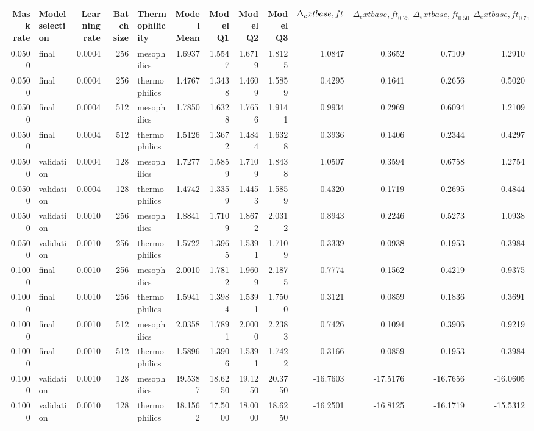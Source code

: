 \begin{tabular}{rlrrlrrrrrrrr}
\toprule
Mask rate & Model selection & Learning rate & Batch size & Thermophilicity & Model Mean & Model Q1 & Model Q2 & Model Q3 & $\Bar{\Delta_	ext{base,ft}}$ & $\Delta_	ext{base,ft}_0.25$ & $\Delta_	ext{base,ft}_0.50$ & $\Delta_	ext{base,ft}_0.75$ \\
\midrule
0.0500 & final & 0.0004 & 256 & mesophilics & 1.6937 & 1.5547 & 1.6719 & 1.8125 & 1.0847 & 0.3652 & 0.7109 & 1.2910 \\
0.0500 & final & 0.0004 & 256 & thermophilics & 1.4767 & 1.3438 & 1.4609 & 1.5859 & 0.4295 & 0.1641 & 0.2656 & 0.5020 \\
0.0500 & final & 0.0004 & 512 & mesophilics & 1.7850 & 1.6328 & 1.7656 & 1.9141 & 0.9934 & 0.2969 & 0.6094 & 1.2109 \\
0.0500 & final & 0.0004 & 512 & thermophilics & 1.5126 & 1.3672 & 1.4844 & 1.6328 & 0.3936 & 0.1406 & 0.2344 & 0.4297 \\
0.0500 & validation & 0.0004 & 128 & mesophilics & 1.7277 & 1.5859 & 1.7109 & 1.8438 & 1.0507 & 0.3594 & 0.6758 & 1.2754 \\
0.0500 & validation & 0.0004 & 128 & thermophilics & 1.4742 & 1.3359 & 1.4453 & 1.5859 & 0.4320 & 0.1719 & 0.2695 & 0.4844 \\
0.0500 & validation & 0.0010 & 256 & mesophilics & 1.8841 & 1.7109 & 1.8672 & 2.0312 & 0.8943 & 0.2246 & 0.5273 & 1.0938 \\
0.0500 & validation & 0.0010 & 256 & thermophilics & 1.5722 & 1.3965 & 1.5391 & 1.7109 & 0.3339 & 0.0938 & 0.1953 & 0.3984 \\
0.1000 & final & 0.0010 & 256 & mesophilics & 2.0010 & 1.7812 & 1.9609 & 2.1875 & 0.7774 & 0.1562 & 0.4219 & 0.9375 \\
0.1000 & final & 0.0010 & 256 & thermophilics & 1.5941 & 1.3984 & 1.5391 & 1.7500 & 0.3121 & 0.0859 & 0.1836 & 0.3691 \\
0.1000 & final & 0.0010 & 512 & mesophilics & 2.0358 & 1.7891 & 2.0000 & 2.2383 & 0.7426 & 0.1094 & 0.3906 & 0.9219 \\
0.1000 & final & 0.0010 & 512 & thermophilics & 1.5896 & 1.3906 & 1.5391 & 1.7422 & 0.3166 & 0.0859 & 0.1953 & 0.3984 \\
0.1000 & validation & 0.0010 & 128 & mesophilics & 19.5387 & 18.6250 & 19.1250 & 20.3750 & -16.7603 & -17.5176 & -16.7656 & -16.0605 \\
0.1000 & validation & 0.0010 & 128 & thermophilics & 18.1562 & 17.5000 & 18.0000 & 18.6250 & -16.2501 & -16.8125 & -16.1719 & -15.5312 \\

\end{tabular}
